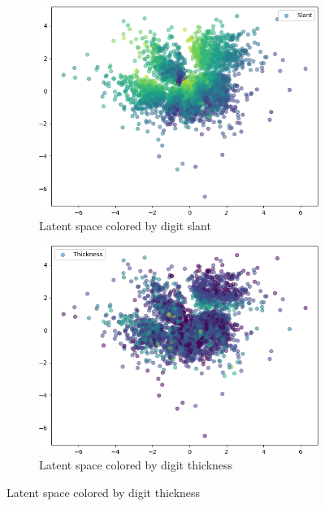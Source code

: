 \begin{figure}
    \centering
    \begin{subfigure}{.32\textwidth}
        \includegraphics[width=\textwidth]{images/latent_spaces/mnist/vae/embeddings_mu_0.png}
        \caption{Latent space colored by digit slant}
        \label{subfig:vae_mnist_latent_space_slant}
    \end{subfigure}
    \hfill
    \begin{subfigure}{.32\textwidth}
        \includegraphics[width=\textwidth]{images/latent_spaces/mnist/vae/embeddings_mu_1.png}
        \caption{Latent space colored by digit thickness}
        \label{subfig:vae_mnist_latent_space_thickness}
    \end{subfigure}

\end{figure}
